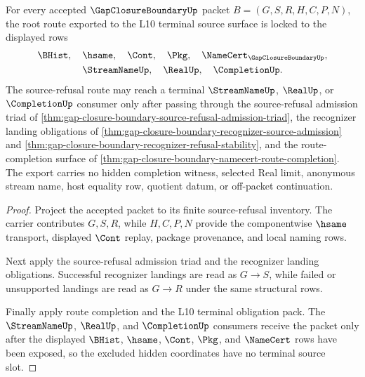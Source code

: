 \begin{theorem}
\label{thm:gap-closure-boundary-l10-terminal-source-lock}
For every accepted $\GapClosureBoundaryUp$ packet $B=(G,S,R,H,C,P,N)$, the root route exported to the L10 terminal source surface is locked to the displayed rows
$$
\begin{gathered}
\BHist,\quad \hsame,\quad \Cont,\quad \Pkg,\quad \NameCert_{\GapClosureBoundaryUp},\\
\StreamNameUp,\quad \RealUp,\quad \CompletionUp.
\end{gathered}
$$
The source-refusal route may reach a terminal $\StreamNameUp$, $\RealUp$, or $\CompletionUp$ consumer only after passing through the source-refusal admission triad of \autoref{thm:gap-closure-boundary-source-refusal-admission-triad}, the recognizer landing obligations of \autoref{thm:gap-closure-boundary-recognizer-source-admission} and \autoref{thm:gap-closure-boundary-recognizer-refusal-stability}, and the route-completion surface of \autoref{thm:gap-closure-boundary-namecert-route-completion}. The export carries no hidden completion witness, selected Real limit, anonymous stream name, host equality row, quotient datum, or off-packet continuation.
\end{theorem}
\begin{proof}
Project the accepted packet to its finite source-refusal inventory. The carrier contributes $G,S,R$, while $H,C,P,N$ provide the componentwise $\hsame$ transport, displayed $\Cont$ replay, package provenance, and local naming rows.

Next apply the source-refusal admission triad and the recognizer landing obligations. Successful recognizer landings are read as $G \longrightarrow S$, while failed or unsupported landings are read as $G \longrightarrow R$ under the same structural rows.

Finally apply route completion and the L10 terminal obligation pack. The $\StreamNameUp$, $\RealUp$, and $\CompletionUp$ consumers receive the packet only after the displayed $\BHist$, $\hsame$, $\Cont$, $\Pkg$, and $\NameCert$ rows have been exposed, so the excluded hidden coordinates have no terminal source slot.
\end{proof}

